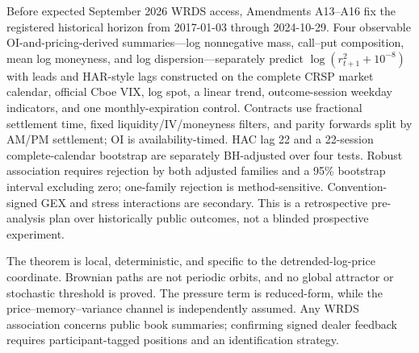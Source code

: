 \documentclass{article}
\begin{document}
Before expected September 2026 WRDS access, Amendments A13--A16 fix the
registered historical horizon from 2017-01-03 through 2024-10-29. Four observable
OI-and-pricing-derived summaries---log nonnegative mass, call--put composition, mean log
moneyness, and log dispersion---separately predict
$\log(r_{t+1}^2+10^{-8})$ with leads and HAR-style lags constructed on the
complete CRSP market calendar, official Cboe VIX, log spot, a linear trend,
outcome-session weekday indicators, and one monthly-expiration control.
Contracts use fractional settlement time, fixed liquidity/IV/moneyness filters,
and parity forwards split by AM/PM settlement; OI is availability-timed.
HAC lag 22 and a 22-session complete-calendar bootstrap are separately BH-adjusted over
four tests. Robust association requires rejection by both adjusted families
and a 95\% bootstrap interval excluding zero; one-family rejection is
method-sensitive. Convention-signed GEX and stress interactions are secondary.
This is a retrospective pre-analysis plan over historically public outcomes,
not a blinded prospective experiment.

The theorem is local, deterministic, and specific to the detrended-log-price
coordinate. Brownian paths are not periodic orbits, and no global attractor or
stochastic threshold is proved. The pressure term is reduced-form, while the
price--memory--variance channel is independently assumed. Any WRDS association
concerns public book summaries; confirming signed dealer feedback requires
participant-tagged positions and an identification strategy.



\end{document}
